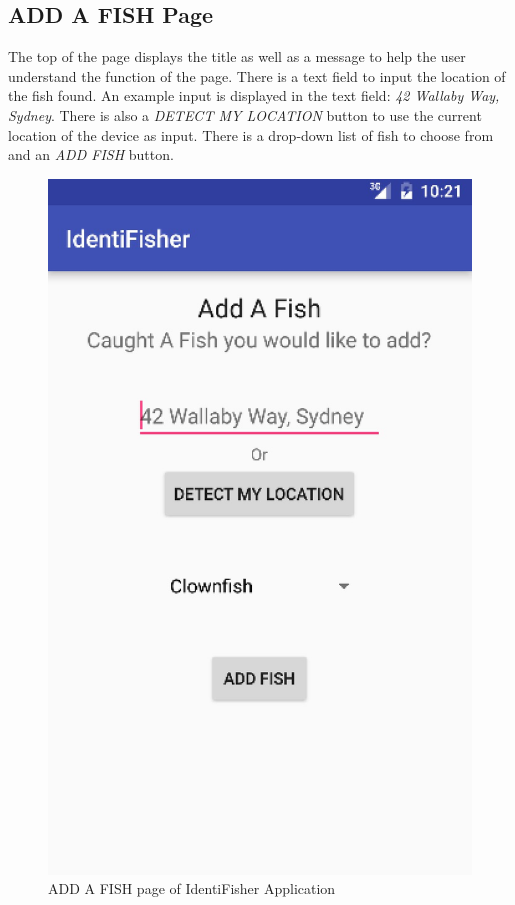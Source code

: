 \documentclass{article}
\begin{document}
\subsection{ADD A FISH Page}
The top of the page displays the title as well as a message to help the user understand the function of the page. There is a text field to input the
location of the fish found. An example input is displayed in the text field: \textit{42 Wallaby Way, Sydney}. There is also a \textit{DETECT MY LOCATION} button
to use the current location of the device as input. There is a drop-down list of fish to choose from and an \textit{ADD FISH} button.\\
\begin{figure}[H]
	\includegraphics[scale=0.30]{AddFish.png}
	\caption{ADD A FISH page of IdentiFisher Application}
\end{figure}
\end{document}
